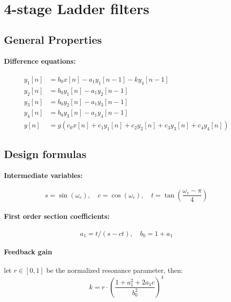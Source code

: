 \section{4-stage Ladder filters}

\subsection{General Properties}

\paragraph{Difference equations:}
\begin{equation}
 \begin{aligned}
 y_1[n] &= b_0   x[n] - a_1 y_1[n-1] - k y_4[n-1]   \\
 y_2[n] &= b_0 y_1[n] - a_1 y_2[n-1]                \\
 y_3[n] &= b_0 y_2[n] - a_1 y_3[n-1]                \\
 y_4[n] &= b_0 y_3[n] - a_1 y_4[n-1]                \\
 y[n]   &= g (c_0 x[n] + c_1 y_1[n] + c_2 y_2[n] + c_3 y_3[n] + c_4 y_4[n])
 \end{aligned}
\end{equation}

\subsection{Design formulas}

\paragraph{Intermediate variables:}
\begin{equation}
  s = \sin(\omega_c), \quad c = \cos(\omega_c), \quad t = \tan \left( \frac{\omega_c-\pi}{4} \right)
\end{equation}

\paragraph{First order section coefficients:}
\begin{equation}
  a_1 = t/(s-ct), \quad b_0 = 1+a_1
\end{equation}

\paragraph{Feedback gain} let $r \in [0,1]$ be the normalized resonance parameter, then:
\begin{equation}
  k = r \cdot \left( \frac{1 + a_1^2 + 2 a_1 c}{b_0^2} \right)^4
\end{equation}

